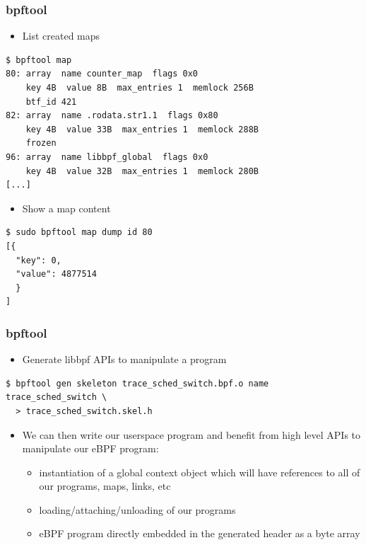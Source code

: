 \begin{frame}[fragile]
  \frametitle{bpftool}
  \begin{itemize}
    \item List created maps
  \end{itemize}
  \begin{block}{}
    \fontsize{9}{9}\selectfont
    \begin{verbatim}
$ bpftool map
80: array  name counter_map  flags 0x0
    key 4B  value 8B  max_entries 1  memlock 256B
    btf_id 421
82: array  name .rodata.str1.1  flags 0x80
    key 4B  value 33B  max_entries 1  memlock 288B
    frozen
96: array  name libbpf_global  flags 0x0
    key 4B  value 32B  max_entries 1  memlock 280B
[...]
    \end{verbatim}
  \end{block}
  \begin{itemize}
    \item Show a map content
  \end{itemize}
  \begin{block}{}
    \fontsize{9}{9}\selectfont
    \begin{verbatim}
$ sudo bpftool map dump id 80
[{
  "key": 0,
  "value": 4877514
  }
]
    \end{verbatim}
  \end{block}
\end{frame}

\begin{frame}[fragile]
  \frametitle{bpftool}
  \begin{itemize}
    \item Generate libbpf APIs to manipulate a program
  \end{itemize}
  \begin{block}{}
    \fontsize{9}{9}\selectfont
    \begin{verbatim}
$ bpftool gen skeleton trace_sched_switch.bpf.o name trace_sched_switch \
  > trace_sched_switch.skel.h
    \end{verbatim}
  \end{block}
  \begin{itemize}
    \item We can then write our userspace program and benefit from high level
    APIs to manipulate our eBPF program:
    \begin{itemize}
      \item instantiation of a global context object which will have references
      to all of our programs, maps, links, etc
      \item loading/attaching/unloading of our programs
      \item eBPF program directly embedded in the generated header as a byte
      array
    \end{itemize}
  \end{itemize}
\end{frame}

